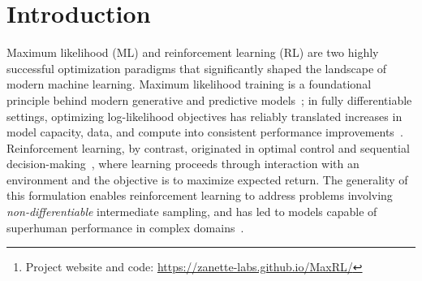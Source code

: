 \documentclass[10pt]{article} %
\begin{document}
\begin{abstract}
Reinforcement learning is the method of choice to train models in \textit{sampling-based} setups with binary outcome feedback, such as navigation, code generation, and mathematical problem solving. In such settings, models implicitly induce a likelihood over correct rollouts. However, we observe that reinforcement learning does not maximize this likelihood, and instead optimizes only a lower-order approximation. Inspired by this observation, we introduce \textbf{Maximum Likelihood Reinforcement Learning (MaxRL)}, a sampling-based framework to approximate maximum likelihood using reinforcement learning techniques. MaxRL addresses the challenges of non-differentiable sampling by defining a compute-indexed family of sample-based objectives that interpolate between standard reinforcement learning and exact maximum likelihood as additional sampling compute is allocated. The resulting objectives admit a simple, unbiased policy-gradient estimator and converge to maximum likelihood optimization in the infinite-compute limit. Empirically, we show that MaxRL Pareto-dominates existing methods in all models and tasks we tested, achieving up to $\mathbf{20\times}$ test-time scaling efficiency gains compared to its GRPO-trained counterpart. We also observe MaxRL to scale better with additional data and compute. Our results suggest MaxRL is a promising framework for scaling RL training in correctness based settings.\footnote{Project website and code: \url{https://zanette-labs.github.io/MaxRL/}}
\end{abstract}

\section{Introduction}

Maximum likelihood (ML) and reinforcement learning (RL) are two highly successful optimization paradigms that significantly shaped the landscape of modern machine learning. Maximum likelihood training is a foundational principle behind modern generative and predictive models~\citep{bishop2006prml,murphy2012mlpp}; in fully differentiable settings, optimizing log-likelihood objectives has reliably translated increases in model capacity, data, and compute into consistent performance improvements~\citep{alexnet,radford2018improving}. Reinforcement learning, by contrast, originated in optimal control and sequential decision-making~\citep{bertsekas1995dynamic,sutton1998reinforcement}, where learning proceeds through interaction with an environment and the objective is to maximize expected return. The generality of this formulation enables reinforcement learning to address problems involving \emph{non-differentiable} intermediate sampling, and has led to models capable of superhuman performance in complex domains~\citep{mnih2015humanlevel,silver2016mastering}.
\end{document}
